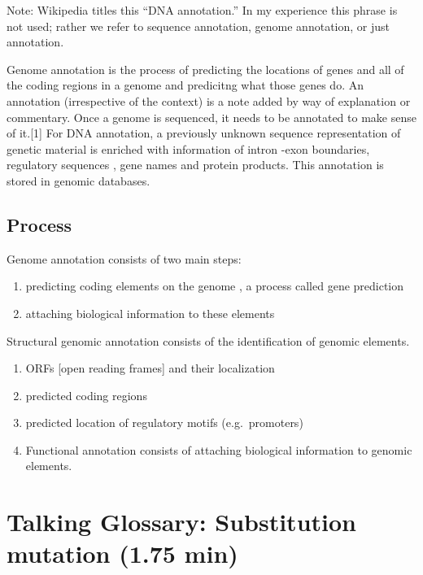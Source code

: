 \documentclass[
]{book}
\providecommand{\tightlist}{%
  \setlength{\itemsep}{0pt}\setlength{\parskip}{0pt}}
\begin{document}
Note: Wikipedia titles this ``DNA annotation.'' In my experience this phrase is not used; rather we refer to sequence annotation, genome annotation, or just annotation.

Genome annotation is the process of predicting the locations of genes and all of the coding regions in a genome and predicitng what those genes do. An annotation (irrespective of the context) is a note added by way of explanation or commentary. Once a genome is sequenced, it needs to be annotated to make sense of it.{[}1{]}
For DNA annotation, a previously unknown sequence representation of genetic material is enriched with information of intron -exon boundaries, regulatory sequences , gene names and protein products. This annotation is stored in genomic databases.

\hypertarget{process}{%
\subsection{Process}\label{process}}

Genome annotation consists of two main steps:

\begin{enumerate}
\def\labelenumi{\arabic{enumi}.}
\tightlist
\item
  predicting coding elements on the genome , a process called gene prediction
\item
  attaching biological information to these elements
\end{enumerate}

Structural genomic annotation consists of the identification of genomic elements.

\begin{enumerate}
\def\labelenumi{\arabic{enumi}.}
\tightlist
\item
  ORFs {[}open reading frames{]} and their localization
\item
  predicted coding regions
\item
  predicted location of regulatory motifs (e.g.~promoters)
\item
  Functional annotation consists of attaching biological information to genomic elements.
\end{enumerate}

\hypertarget{talking-glossary-substitution-mutation-1.75-min}{%
\section{Talking Glossary: Substitution mutation (1.75 min)}\label{talking-glossary-substitution-mutation-1.75-min}}
\end{document}
